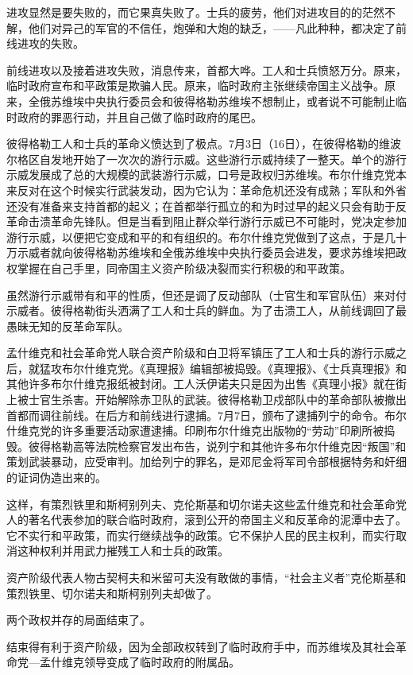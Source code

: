 进攻显然是要失败的，而它果真失败了。士兵的疲劳，他们对进攻目的的茫然不解，他们对异己的军官的不信任，炮弹和大炮的缺乏，——凡此种种，都决定了前线进攻的失败。

前线进攻以及接着进攻失败，消息传来，首都大哗。工人和士兵愤怒万分。原来，临时政府宣布和平政策是欺骗人民。原来，临时政府主张继续帝国主义战争。原来，全俄苏维埃中央执行委员会和彼得格勒苏维埃不想制止，或者说不可能制止临时政府的罪恶行动，并且自己做了临时政府的尾巴。

彼得格勒工人和士兵的革命义愤达到了极点。7月3日（16日），在彼得格勒的维波尔格区自发地开始了一次次的游行示威。这些游行示威持续了一整天。单个的游行示威发展成了总的大规模的武装游行示威，口号是政权归苏维埃。布尔什维克党本来反对在这个时候实行武装发动，因为它认为：革命危机还没有成熟；军队和外省还没有准备来支持首都的起义；在首都举行孤立的和为时过早的起义只会有助于反革命击溃革命先锋队。但是当看到阻止群众举行游行示威已不可能时，党决定参加游行示威，以便把它变成和平的和有组织的。布尔什维克党做到了这点，于是几十万示威者就向彼得格勒苏维埃和全俄苏维埃中央执行委员会进发，要求苏维埃把政权掌握在自己手里，同帝国主义资产阶级决裂而实行积极的和平政策。

虽然游行示威带有和平的性质，但还是调了反动部队（士官生和军官队伍）来对付示威者。彼得格勒街头洒满了工人和士兵的鲜血。为了击溃工人，从前线调回了最愚昧无知的反革命军队。

孟什维克和社会革命党人联合资产阶级和白卫将军镇压了工人和士兵的游行示威之后，就猛攻布尔什维克党。《真理报》编辑部被捣毁。《真理报》、《士兵真理报》和其他许多布尔什维克报纸被封闭。工人沃伊诺夫只是因为出售《真理小报》就在街上被士官生杀害。开始解除赤卫队的武装。彼得格勒卫戍部队中的革命部队被撤出首都而调往前线。在后方和前线进行逮捕。7月7日，颁布了逮捕列宁的命令。布尔什维克党的许多重要活动家遭逮捕。印刷布尔什维克出版物的“劳动”印刷所被捣毁。彼得格勒高等法院检察官发出布告，说列宁和其他许多布尔什维克因“叛国”和策划武装暴动，应受审判。加给列宁的罪名，是邓尼金将军司令部根据特务和奸细的证词伪造出来的。

这样，有策烈铁里和斯柯别列夫、克伦斯基和切尔诺夫这些孟什维克和社会革命党人的著名代表参加的联合临时政府，滚到公开的帝国主义和反革命的泥潭中去了。它不实行和平政策，而实行继续战争的政策。它不保护人民的民主权利，而实行取消这种权利并用武力摧残工人和士兵的政策。

资产阶级代表人物古契柯夫和米留可夫没有敢做的事情，“社会主义者”克伦斯基和策烈铁里、切尔诺夫和斯柯别列夫却做了。

两个政权并存的局面结束了。

结束得有利于资产阶级，因为全部政权转到了临时政府手中，而苏维埃及其社会革命党—孟什维克领导变成了临时政府的附属品。

